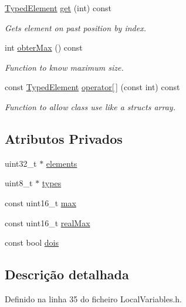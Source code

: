 \begin{DoxyCompactItemize}
\hyperlink{BasicTypes_8h_a97b332303b1262282599e6ede0637b82}{Typed\+Element} \hyperlink{classLocalVariables_a4abbb4a732d7dd0f11a147b79c15ae10}{get} (int) const
\begin{DoxyCompactList}\small\item\em Gets element on past position by index. \end{DoxyCompactList}\item 
int \hyperlink{classLocalVariables_acf8ee1db2a3427c30eb3e489d7a4478c}{obter\+Max} () const
\begin{DoxyCompactList}\small\item\em Function to know maximum size. \end{DoxyCompactList}\item 
const \hyperlink{BasicTypes_8h_a97b332303b1262282599e6ede0637b82}{Typed\+Element} \hyperlink{classLocalVariables_a6e978f3c992385f2909261e995105142}{operator\mbox{[}$\,$\mbox{]}} (const int) const
\begin{DoxyCompactList}\small\item\em Function to allow class use like a struct\textquotesingle{}s array. \end{DoxyCompactList}\end{DoxyCompactItemize}
\subsection*{Atributos Privados}
\begin{DoxyCompactItemize}
\item 
uint32\+\_\+t $\ast$ \hyperlink{classLocalVariables_a0015e9d8a61d4643f6f3594785467ae4}{elements}
\item 
uint8\+\_\+t $\ast$ \hyperlink{classLocalVariables_ac73d4583cc3f8b295c8c986cee21fe30}{types}
\item 
const uint16\+\_\+t \hyperlink{classLocalVariables_a55f33aaf9a0af5176d460616402c4aeb}{max}
\item 
const uint16\+\_\+t \hyperlink{classLocalVariables_a892e685ce3c1c5e6da9e1db542d865e9}{real\+Max}
\item 
const bool \hyperlink{classLocalVariables_a8357edb6ae793a8f031ae3733751e1fc}{dois}
\end{DoxyCompactItemize}


\subsection{Descrição detalhada}


Definido na linha 35 do ficheiro Local\+Variables.\+h.




